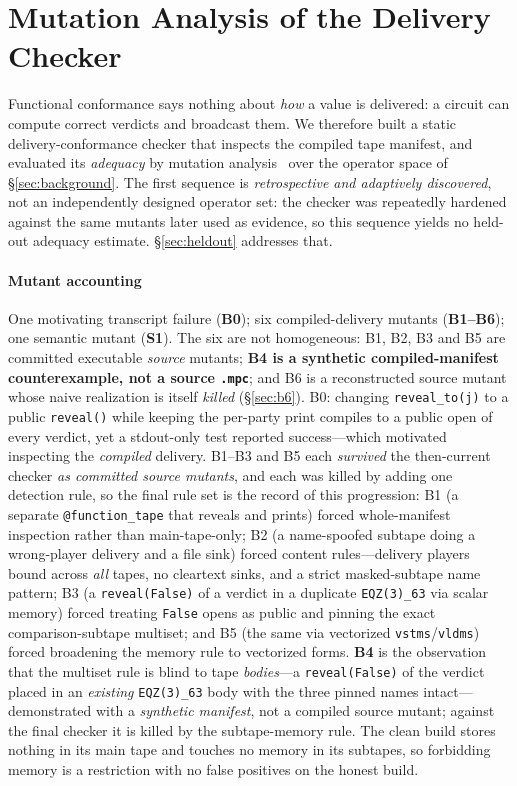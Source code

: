 \documentclass[conference]{IEEEtran}
\newcommand{\code}[1]{\texttt{\small #1}}
\begin{document}
\section{Mutation Analysis of the Delivery Checker}
\label{sec:mutation}
Functional conformance says nothing about \emph{how} a value is delivered: a circuit can
compute correct verdicts and broadcast them. We therefore built a static
delivery-conformance checker that inspects the compiled tape manifest, and evaluated its
\emph{adequacy} by mutation analysis~\cite{demillo1978,jiaharman} over the operator space
of \S\ref{sec:background}. The first sequence is \emph{retrospective and adaptively
discovered}, not an independently designed operator set: the checker was repeatedly
hardened against the same mutants later used as evidence, so this sequence yields no
held-out adequacy estimate. \S\ref{sec:heldout} addresses that.

\paragraph{Mutant accounting}
One motivating transcript failure (\textbf{B0}); six compiled-delivery mutants
(\textbf{B1--B6}); one semantic mutant (\textbf{S1}). The six are not homogeneous: B1, B2,
B3 and B5 are committed executable \emph{source} mutants; \textbf{B4 is a synthetic
compiled-manifest counterexample, not a source \code{.mpc}}; and B6 is a reconstructed
source mutant whose naive realization is itself \emph{killed} (\S\ref{sec:b6}). B0:
changing \code{reveal\_to(j)} to a public \code{reveal()} while keeping the per-party print
compiles to a public open of every verdict, yet a stdout-only test reported success---which
motivated inspecting the \emph{compiled} delivery. B1--B3 and B5 each \emph{survived} the
then-current checker \emph{as committed source mutants}, and each was killed by adding one
detection rule, so the final rule set is the record of this progression: B1 (a separate
\code{@function\_tape} that reveals and prints) forced whole-manifest inspection rather than
main-tape-only; B2 (a name-spoofed subtape doing a wrong-player delivery and a file sink)
forced content rules---delivery players bound across \emph{all} tapes, no cleartext sinks,
and a strict masked-subtape name pattern; B3 (a \code{reveal(False)} of a verdict in a
duplicate \code{EQZ(3)\_63} via scalar memory) forced treating \code{False} opens as public
and pinning the exact comparison-subtape multiset; and B5 (the same via vectorized
\code{vstms}/\code{vldms}) forced broadening the memory rule to vectorized forms.
\textbf{B4} is the observation that the multiset rule is blind to tape
\emph{bodies}---a \code{reveal(False)} of the verdict placed in an \emph{existing}
\code{EQZ(3)\_63} body with the three pinned names intact---demonstrated with a
\emph{synthetic manifest}, not a compiled source mutant; against the final checker it is
killed by the subtape-memory rule. The clean build stores nothing in its main tape and
touches no memory in its subtapes, so forbidding memory is a restriction with no false
positives on the honest build.
\end{document}
